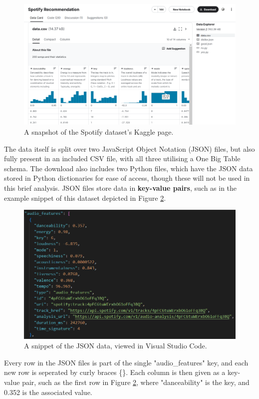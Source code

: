 \documentclass[12pt]{report}
\begin{document}
\begin{figure}[H]
    \centering
    \includegraphics[width=.75\linewidth]{Spotify-Kaggle.png}
    \caption{A snapshot of the Spotify dataset's Kaggle page.}
    \label{fig:Spotify-Kaggle}
\end{figure}

The data itself is split over 
two JavaScript Object Notation (JSON) files, but also fully present in an included CSV file, with all three utilising a One Big Table schema. The 
download also includes two Python files, which have the JSON data stored in Python dictionaries for ease of access, though these will not be used in 
this brief analysis. JSON files store data in \textbf{key-value pairs}, such as in the example snippet of this dataset depicted in Figure \ref{fig:spotifySnippet}.  

\begin{figure}[H]
    \centering
    \includegraphics[width=.75\linewidth]{spotifySnippet.png}
    \caption{A snippet of the JSON data, viewed in Visual Studio Code.}
    \label{fig:spotifySnippet}
\end{figure}

Every row in the JSON files is part of the single "audio\_features" key, and each new row is seperated by curly braces \{\}. Each column is then given as a 
key-value pair, such as the first row in Figure \ref{fig:spotifySnippet}, where "danceability" is the key, and 0.352 is the associated value.
\end{document}
